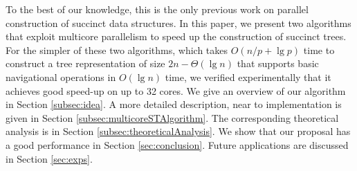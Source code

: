 To the best of our knowledge, this is the only previous work on parallel
construction of succinct data structures. In this paper, we present two
algorithms that exploit multicore parallelism to speed up the construction
of succinct trees.
For the simpler of these two algorithms, which takes $O(n/p + \lg p)$ time
to construct a tree representation of size $2n - \Theta(\lg n)$ that supports
basic navigational operations in $O(\lg n)$ time, we verified experimentally
that it achieves good speed-up on up to 32 cores.
We give an overview
of our algorithm in Section \ref{subsec:idea}. A more detailed description,
near to implementation is given in Section \ref{subsec:multicoreSTAlgorithm}.
The corresponding theoretical analysis is in Section \ref{subsec:theoreticalAnalysis}.
We show that our proposal has a good performance in Section \ref{sec:conclusion}. Future
applications are discussed in Section \ref{sec:exps}.
